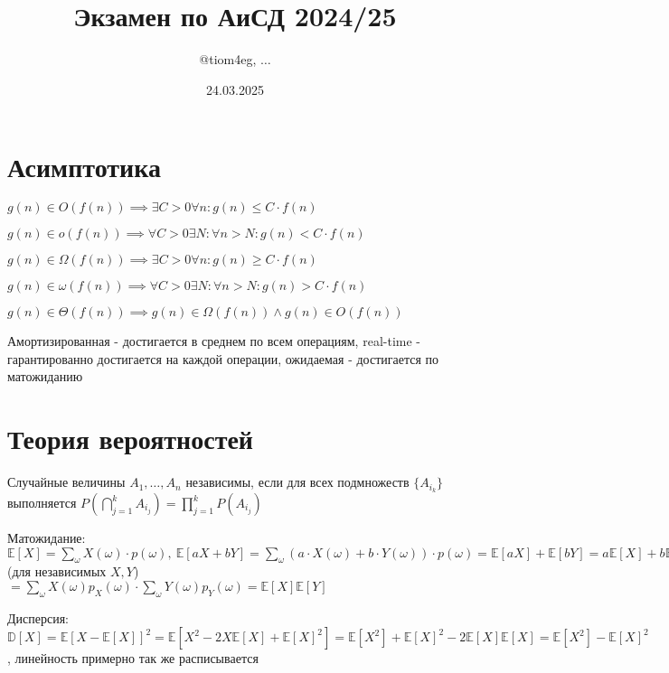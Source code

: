 \documentclass{article}
\title{Экзамен по АиСД 2024/25}
\author{@tiom4eg, $\dots$}
\date{24.03.2025}
\begin{document}
\maketitle

\tableofcontents
\newpage

\section{Асимптотика}

$g(n) \in O(f(n)) \implies \exists C > 0 \forall n : g(n) \leq C \cdot f(n)$

$g(n) \in o(f(n)) \implies \forall C > 0 \exists N : \forall n > N : g(n) < C \cdot f(n)$

$g(n) \in \Omega(f(n)) \implies \exists C > 0 \forall n : g(n) \geq C \cdot f(n)$

$g(n) \in \omega(f(n)) \implies \forall C > 0 \exists N : \forall n > N : g(n) > C \cdot f(n)$

$g(n) \in \Theta(f(n)) \implies g(n) \in \Omega(f(n)) \land g(n) \in O(f(n))$

Амортизированная - достигается в среднем по всем операциям, real-time - гарантированно достигается на каждой операции, ожидаемая - достигается по матожиданию

\section{Теория вероятностей}

Случайные величины $A_1, \dots, A_n$ независимы, если для всех подмножеств $\{A_{i_k}\}$ выполняется $P(\bigcap \limits_{j=1}^{k} A_{i_j}) = \prod \limits_{j=1}^{k} P(A_{i_j})$

Матожидание: $\mathbb{E}[X] = \sum \limits_{\omega} X(\omega) \cdot p(\omega), \ \mathbb{E}[aX + bY] = \sum \limits_{\omega} (a \cdot X(\omega) + b \cdot Y(\omega)) \cdot p(\omega) = \mathbb{E}[aX] + \mathbb{E}[bY] = a \mathbb{E}[X] + b \mathbb{E}[Y], \ \mathbb{E}[XY] = \sum \limits_{\omega} X(\omega) Y(\omega) p_X(\omega) p_Y(\omega)$ (для независимых $X, Y$) $= \sum \limits_{\omega} X(\omega) p_X(\omega) \cdot \sum \limits_{\omega} Y(\omega) p_Y(\omega) = \mathbb{E}[X] \mathbb{E}[Y]$

Дисперсия: $\mathbb{D}[X] = \mathbb{E}[X - \mathbb{E}[X]]^2 = \mathbb{E}[X^2 - 2X\mathbb{E}[X] + \mathbb{E}[X]^2] = \mathbb{E}[X^2] + \mathbb{E}[X]^2 - 2\mathbb{E}[X]\mathbb{E}[X] = \mathbb{E}[X^2] - \mathbb{E}[X]^2$, линейность примерно так же расписывается
\end{document}
